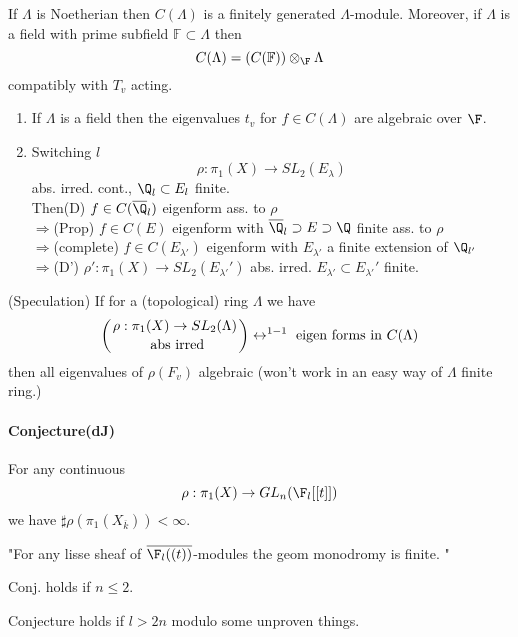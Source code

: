 \begin{prop}[dJ. 4.7] If $\Lambda$ is Noetherian then $C(\Lambda)$ is a finitely generated $\Lambda$-module. Moreover, if $\Lambda$ is a field with prime subfield $\mathbb F\subset \Lambda$ then
	$$C(\Lambda)=(C(\mathbb F))\otimes_{\F}\Lambda$$
	compatibly with $T_v$ acting. 
\end{prop}

\begin{cor}
\begin{enumerate}[(1)]
	\item If $\Lambda$ is a field then the eigenvalues $t_v$ for $f\in C(\Lambda)$ are algebraic over $\F$. 
	\item Switching $l$
	$$\rho: \pi_1(X)\to SL_2(E_\lambda)$$
	abs. irred. cont., $\Q_l\subset E_l$ finite. \\
	Then(D) $f\in C(\overline\Q_l)$ eigenform ass. to $\rho$\\
	$\Rightarrow$(Prop) $f\in C(E)$ eigenform with $\overline\Q_l\supset E\supset \Q$ finite ass. to $\rho$\\
	$\Rightarrow$(complete) $f\in C(E_{\lambda'})$ eigenform with $E_{\lambda'}$ a finite extension of $\Q_{l'}$\\
	$\Rightarrow$(D') $\rho': \pi_1(X)\to SL_2(E_{\lambda'}')$ abs. irred. $E_{\lambda'}\subset E_{\lambda'}'$ finite. 
\end{enumerate}
\end{cor}

\noindent
(Speculation) If for a (topological) ring $\Lambda$ we have 
	$$\left({\rho: \pi_1(X)\to SL_2(\Lambda)\atop \text{ abs irred}}\right)\leftrightarrow^{1-1} \text{ eigen forms in } C(\Lambda)$$
	then all eigenvalues of $\rho(F_v)$ algebraic (won't work in an easy way of $\Lambda$ finite ring.)
	
\paragraph{Conjecture(dJ)} For any continuous 
	$$\rho: \pi_1(X)\to GL_n(\F_l[[t]])$$
	we have $\sharp \rho(\pi_1(X_{\overline k}))<\infty$. 
	
	"For any lisse sheaf of $\overline{\F_l((t))}$-modules the geom monodromy is finite. "
	
\begin{thm}[dJ] Conj. holds if $n\leq 2$. 
\end{thm}

\begin{thm}[G] Conjecture holds if $l>2n$ modulo some unproven things. 
\end{thm}

